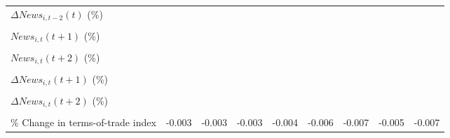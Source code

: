 {\begin{tabular}{l*{8}{c}}
\addlinespace
$ \Delta News_{i,t-2}(t)$ (\%)&                     &                     &                     &                     &                     &                     &                     &                     \\
                    &                     &                     &                     &                     &                     &                     &                     &                     \\
\addlinespace
$ News_{i,t}(t+1)$ (\%)&                     &                     &                     &                     &                     &                     &                     &                     \\
                    &                     &                     &                     &                     &                     &                     &                     &                     \\
\addlinespace
$ News_{i,t}(t+2)$ (\%)&                     &                     &                     &                     &                     &                     &                     &                     \\
                    &                     &                     &                     &                     &                     &                     &                     &                     \\
\addlinespace
$ \Delta News_{i,t}(t+1)$ (\%)&                     &                     &                     &                     &                     &                     &                     &                     \\
                    &                     &                     &                     &                     &                     &                     &                     &                     \\
\addlinespace
$ \Delta News_{i,t}(t+2)$ (\%)&                     &                     &                     &                     &                     &                     &                     &                     \\
                    &                     &                     &                     &                     &                     &                     &                     &                     \\
\addlinespace
\% Change in terms-of-trade index&      -0.003         &      -0.003         &      -0.003         &      -0.004         &      -0.006         &      -0.007         &      -0.005         &      -0.007         \\

\end{tabular}}
